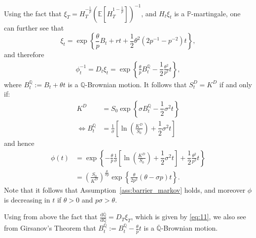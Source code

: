 \documentclass[a4paper]{amsart}
\theoremstyle{definition}
\theoremstyle{remark}
\numberwithin{equation}{section}
\newcommand{\E}{\mathbb{E}}
\renewcommand{\P}{\mathbb{P}}
\newcommand{\Q}{\mathbb{Q}}
\newcommand{\di}{\mathrm{d}}
\newcommand{\half}{\dfrac{1}{2}}
\newcommand{\Ep}[1]{\E\left[#1\right]}
\newcommand{\comment}[1]{{\color{red} \bf #1}}
\newcommand{\ol}{\overline}
\newcommand{\bQ}{\ol{\mathbb{Q}}}
\begin{document}
Using the fact that $\xi_T = H_T^{-\frac{1}{p}} \left(\Ep{H_T^{1-\frac{1}{p}}}\right)^{-1}$, and $H_t \xi_t$ is a $\P$-martingale, one can further see that
\begin{equation*}
  \xi_t = \exp\left\{ \frac{\theta}{p} B_t + rt + \half \theta^2 (2 p^{-1} - p^{-2}) t\right\},
\end{equation*}
and therefore
\begin{align}
  \phi_t^{-1} = D_t\xi_t = \exp\left\{ \frac{\theta}{p} B_t^{\Q} - \half \frac{\theta^2}{p^2}t\right\}, \label{eq:11}
\end{align}
where $B_t^\Q := B_t + \theta t$ is a $\Q$-Brownian motion. It follows that $S_t^D = K^D$ if and only if:
\begin{align}
  K^D & = S_0 \exp\left\{ \sigma B_t^\Q - \half \sigma^2 t\right\} \nonumber\\
  \iff B_t^\Q & = \frac{1}{\sigma} \left[ \ln \left( \frac{K^D}{S_0}\right) + \half \sigma^2 t\right]       \label{eq:10}
\end{align}
and hence
\begin{align*}
  \phi(t) & = \exp\left\{ -\frac{\theta}{p} \frac{1}{\sigma} \left[ \ln \left( \frac{K^D}{S_0}\right) + \half \sigma^2 t\right]  + \half \frac{\theta^2}{p^2}t\right\}\\
  & = \left( \frac{S_0}{K^D}\right)^{\frac{\theta}{\sigma p}} \exp\left\{ \frac{\theta}{2p^2} \left( \theta-\sigma p\right)t\right\}.
\end{align*}
Note that it follows that Assumption~\ref{ass:barrier_markov} holds, and moreover $\phi$ is decreasing in $t$ if $\theta>0$ and $p \sigma > \theta$.


Using from above the fact that  $\frac{\di \bQ}{\di \Q} = D_T \xi_T$, which is given by \eqref{eq:11}, we also see from Girsanov's Theorem that $B_t^{\bQ} := B_t^\Q - \frac{\theta}{p} t$ is a $\bQ$-Brownian motion.
\end{document}
